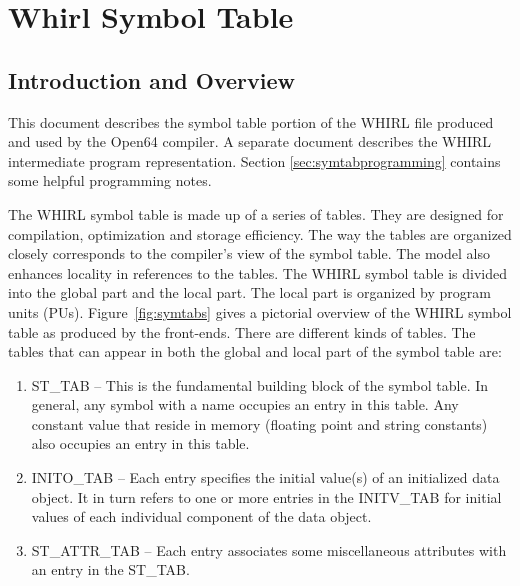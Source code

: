 
%
\chapter{Whirl Symbol Table}
\label{chap:symtab}


\section{Introduction and Overview}

This document describes the symbol table portion of the WHIRL file
produced and used by the Open64 compiler. A separate document
describes the WHIRL intermediate program representation.  Section
\ref{sec:symtabprogramming} contains some helpful programming notes.
 
The WHIRL symbol table is made up of a series of tables. They are
designed for compilation, optimization and storage efficiency. The way
the tables are organized closely corresponds to the compiler's view of
the symbol table. The model also enhances locality in references to
the tables. The WHIRL symbol table is divided into the global part and
the local part. The local part is organized by program units
(PUs). Figure~\ref{fig:symtabs} gives a pictorial overview of the
WHIRL symbol table as produced by the front-ends. There are different
kinds of tables. The tables that can appear in both the global and
local part of the symbol table are:

\begin{enumerate}
\item
{}%
ST\_TAB -- This is the fundamental building block of the symbol
  table. In general, any symbol with a name occupies an entry in this
  table.  Any constant value that reside in memory (floating point
  and string constants) also occupies an entry in this table.

\item
{}%
INITO\_TAB -- Each entry specifies the initial value(s) of an
  initialized data object. It in turn refers to one or more entries in
the
%
INITV\_TAB for initial values of each individual component of
  the data object.

\item
{}%
ST\_ATTR\_TAB -- Each entry associates some miscellaneous
  attributes with an entry in the ST\_TAB.
\end{enumerate}

